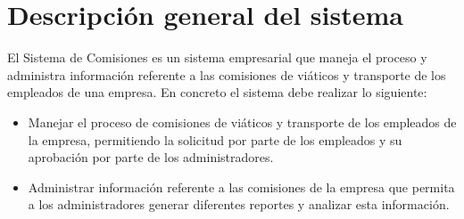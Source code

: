 \section{Descripción general del sistema}
	
	El Sistema de Comisiones es un sistema empresarial que maneja el proceso y administra información referente a las comisiones de viáticos y transporte de los empleados de una empresa. En concreto el sistema debe realizar lo siguiente: 
	 
	\begin{itemize}
		\item Manejar el proceso de comisiones de viáticos y transporte de los empleados de la empresa, permitiendo la solicitud por parte de los empleados y su aprobación por parte de los administradores.
		\item Administrar información referente a las comisiones de la empresa que permita a los administradores generar diferentes reportes y analizar esta información.
	\end{itemize}


	

